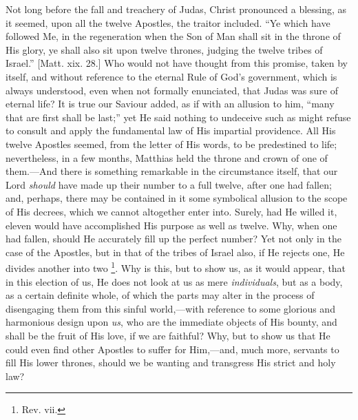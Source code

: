 Not long before the fall and treachery of Judas, Christ pronounced a
blessing, as it seemed, upon all the twelve Apostles, the traitor
included. ``Ye which have followed Me, in the regeneration when the
Son of Man shall sit in the throne of His glory, ye shall also sit upon
twelve thrones, judging the twelve tribes of Israel.'' [Matt. xix.
28.] Who would not have thought from this promise, taken by itself, and
without reference to the eternal Rule of God's government, which is
always understood, even when not formally enunciated, that Judas was
sure of eternal life? It is true our Saviour added, as if with an
allusion to him, ``many that are first shall be last;'' yet He
said nothing to undeceive such as might refuse to consult and apply the
fundamental law of His impartial providence. All His twelve Apostles
seemed, from the letter of His words, to be predestined to life;
nevertheless, in a few months, Matthias held the throne and crown of one
of them.—And there is something remarkable in the circumstance itself,
that our Lord \emph{should} have made up their number to a full twelve,
after one had fallen; and, perhaps, there may be contained in it some
symbolical allusion to the scope of His decrees, which we cannot
altogether enter into. Surely, had He willed it, eleven would have
accomplished His purpose as well as twelve. Why, when one had fallen,
should He accurately fill up the perfect number? Yet not only in the
case of the Apostles, but in that of the tribes of Israel also, if He
rejects one, He divides another into two \footnote{Rev. vii.}. Why is this, but to show us, as it would appear, that in this
election of us, He does not look at us as mere \emph{individuals}, but
as a body, as a certain definite whole, of which the parts may alter in
the process of disengaging them from this sinful world,—with reference
to some glorious and harmonious design upon \emph{us}, who are the
immediate objects of His bounty, and shall be the fruit of His love, if
we are faithful? Why, but to show us that He could even find other
Apostles to suffer for Him,—and, much more, servants to fill His lower
thrones, should we be wanting and transgress His strict and holy law?

